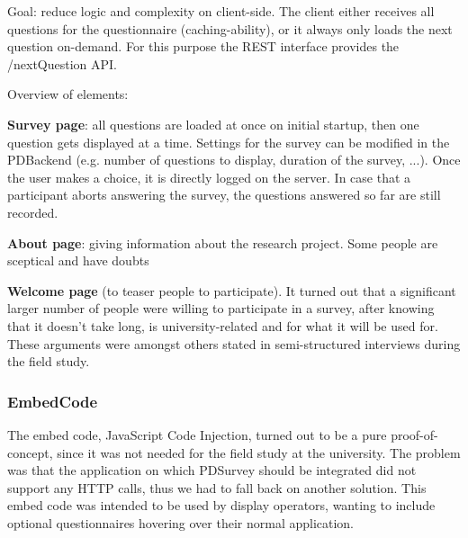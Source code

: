 		
			Goal: reduce logic and complexity on client-side. The client either receives all questions for the questionnaire (caching-ability), or it always only loads the next question on-demand. For this purpose the REST interface provides the /nextQuestion API.
		

		Overview of elements:

		\textbf{Survey page}: all questions are loaded at once on initial startup, then one question gets displayed at a time. Settings for the survey can be modified in the PDBackend (e.g. number of questions to display, duration of the survey, ...). Once the user makes a choice, it is directly logged on the server. In case that a participant aborts answering the survey, the questions answered so far are still recorded.

		\textbf{About page}: giving information about the research project. Some people are sceptical and have doubts 

		\textbf{Welcome page} (to teaser people to participate). It turned out that a significant larger number of people were willing to participate in a survey, after knowing that it doesn't take long, is university-related and for what it will be used for. These arguments were amongst others stated in semi-structured interviews during the field study.





	\subsubsection{EmbedCode}

		The embed code, JavaScript Code Injection, turned out to be a pure proof-of-concept, since it was not needed for the field study at the university. The problem was that the application on which PDSurvey should be integrated did not support any HTTP calls, thus we had to fall back on another solution. This embed code was intended to be used by display operators, wanting to include optional questionnaires hovering over their normal application. 



